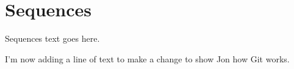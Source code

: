 \section{Sequences}

Sequences text goes here. 

I'm now adding a line of text to make a change to show Jon how Git works.


